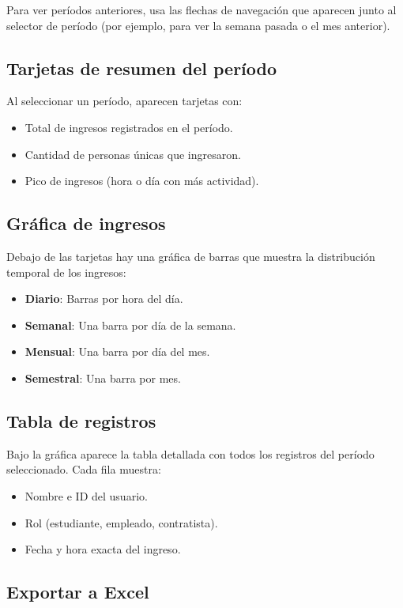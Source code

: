 \documentclass[12pt, a4paper]{article}
\begin{document}
Para ver períodos anteriores, usa las flechas de navegación que
aparecen junto al selector de período (por ejemplo, para ver la semana
pasada o el mes anterior).

\subsection{Tarjetas de resumen del período}

Al seleccionar un período, aparecen tarjetas con:
\begin{itemize}
  \item Total de ingresos registrados en el período.
  \item Cantidad de personas únicas que ingresaron.
  \item Pico de ingresos (hora o día con más actividad).
\end{itemize}

\subsection{Gráfica de ingresos}

Debajo de las tarjetas hay una gráfica de barras que muestra la
distribución temporal de los ingresos:
\begin{itemize}
  \item \textbf{Diario}: Barras por hora del día.
  \item \textbf{Semanal}: Una barra por día de la semana.
  \item \textbf{Mensual}: Una barra por día del mes.
  \item \textbf{Semestral}: Una barra por mes.
\end{itemize}

\subsection{Tabla de registros}

Bajo la gráfica aparece la tabla detallada con todos los registros
del período seleccionado. Cada fila muestra:
\begin{itemize}
  \item Nombre e ID del usuario.
  \item Rol (estudiante, empleado, contratista).
  \item Fecha y hora exacta del ingreso.
\end{itemize}

\subsection{Exportar a Excel}
\end{document}
